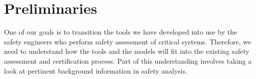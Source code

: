 \section{Preliminaries}
\label{sec:background}
One of our goals is to transition the tools we have developed into use by the safety engineers who perform safety assessment of critical systems. Therefore, we need to understand how the tools and the models will fit into the existing safety assessment and certification process. Part of this understanding involves taking a look at pertinent background information in safety analysis. 








